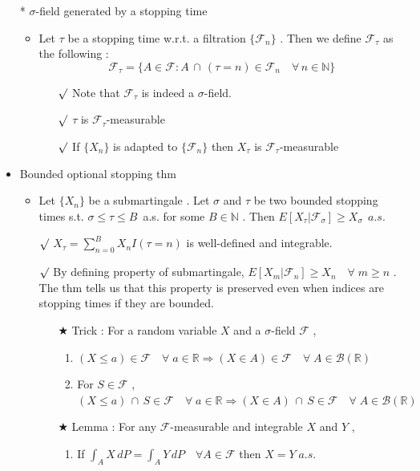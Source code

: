 \documentclass[12pt, A4]{article}
\newcommand{\rmk}{$\surd$}
\newcommand{\trick}{$\bigstar$}
\newcommand{\N}{\mathbb{N}}
\newcommand{\R}{\mathbb{R}}
\newcommand{\B}{\mathcal{B}}
\newcommand{\F}{\mathcal{F}}
\newcommand{\intersect}{\,\cap\,}
\newcommand{\foranyn}{\quad \forall \, n\in \N}
\begin{document}
\begin{itemize}
\begin{itemize}
\begin{itemize}
		\end{itemize} 
	\end{itemize}
	\item[*] $\sigma$-field generated by a stopping time
	\begin{itemize}
		\item Let $\tau$ be a stopping time w.r.t. a filtration $\{\F_n\}$ . Then we define $\F_\tau$ as the following : 
		$$
			\F_\tau = \{A\in \F : A\intersect (\tau=n)\in \F_n \foranyn\}
		$$
		\begin{itemize}
			\item[\rmk] Note that $\F_\tau$ is indeed a $\sigma$-field. 
			\item[\rmk] $\tau$ is $\F_\tau$-measurable
			\item[\rmk] If $\{X_n\}$ is adapted to $\{\F_n\}$ then $X_\tau$ is $\F_\tau$-measurable
		\end{itemize}
	\end{itemize}
	\item Bounded optional stopping thm
	\begin{itemize}
		\item Let $\{X_n\}$ be a submartingale . Let $\sigma$ and $\tau$ be two bounded stopping times s.t. $\sigma\leq \tau\leq B$\;\, a.s. for some $B\in \N$ . Then $E[X_\tau |\F_\sigma] \geq X_\sigma\;\, a.s.$
		\item[\rmk] $X_\tau = \sum_{n=0}^B X_nI(\tau=n)$ is well-defined and integrable. 
		\item[\rmk] By defining property of submartingale, $E[X_m|\F_n]\geq X_n \quad \forall \;m\geq n$ . The thm tells us that this property is preserved even when indices are stopping times if they are bounded.
		\begin{itemize}
			\item[\trick] Trick : For a random variable $X$ and a $\sigma$-field $\F$ ,
			\begin{enumerate}
				\item $(X\leq a)\in \F \quad \forall \; a\in \R\Rightarrow (X\in A)\in \F \quad \forall \; A\in \B(\R)$
				\item For $S\in \F$ , $(X\leq a)\intersect S\in \F \quad \forall \; a\in \R\Rightarrow (X\in A)\intersect S \in \F \quad \forall \; A\in \B(\R)$
			\end{enumerate}
			\item[\trick] Lemma : For any $\F$-measurable and integrable $X$ and $Y$ ,
			\begin{enumerate}
				\item If $\int_A X\, dP=\int_A Y \, dP\quad \forall A\in \F$ then $X=Y\; a.s.$ 

\end{enumerate}
\end{itemize}
\end{itemize}
\end{itemize}
\end{document}
